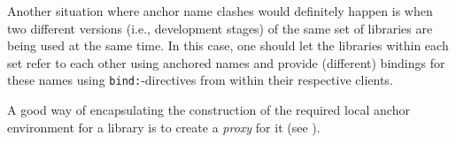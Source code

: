 Another situation where anchor name clashes would definitely happen is
when two different versions (i.e., development stages) of the same set
of libraries are being used at the same time.  In this case, one
should let the libraries within each set refer to each other using
anchored names and provide (different) bindings for these names using
{\tt bind:}-directives from within their respective clients.

A good way of encapsulating the construction of the required local
anchor environment for a library is to create a {\em proxy} for it
(see ).
